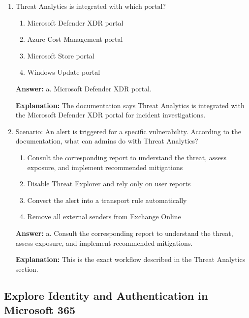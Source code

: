 \documentclass[10pt]{article}
\begin{document}
\begin{enumerate}[leftmargin=*]
\item Threat Analytics is integrated with which portal?
\begin{enumerate}[label=\alph*., leftmargin=1.5em]
\item Microsoft Defender XDR portal
\item Azure Cost Management portal
\item Microsoft Store portal
\item Windows Update portal
\end{enumerate}
\textbf{Answer:} a. Microsoft Defender XDR portal.

\textbf{Explanation:} The documentation says Threat Analytics is integrated with the Microsoft Defender XDR portal for incident investigations.

\item Scenario: An alert is triggered for a specific vulnerability. According to the documentation, what can admins do with Threat Analytics?
\begin{enumerate}[label=\alph*., leftmargin=1.5em]
\item Consult the corresponding report to understand the threat, assess exposure, and implement recommended mitigations
\item Disable Threat Explorer and rely only on user reports
\item Convert the alert into a transport rule automatically
\item Remove all external senders from Exchange Online
\end{enumerate}
\textbf{Answer:} a. Consult the corresponding report to understand the threat, assess exposure, and implement recommended mitigations.

\textbf{Explanation:} This is the exact workflow described in the Threat Analytics section.

\end{enumerate}
\clearpage

\subsection{Explore Identity and Authentication in Microsoft 365}
\end{document}
